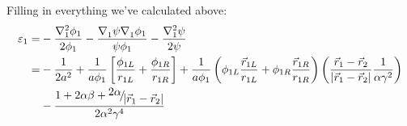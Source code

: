 Filling in everything we've calculated above:
\begin{align}
{\varepsilon _1} =&  - \frac{{\nabla _1^2{\phi _1}}}{{2{\phi _1}}} - \frac{{\nabla _1^{}\psi \nabla _1^{}{\phi _1}}}{{\psi {\phi _1}}} - \frac{{\nabla _1^2\psi }}{{2\psi }}\nonumber\\
 =&  - \frac{1}{{2{a^2}}} + \frac{1}{{a{\phi _1}}}\left[ {\frac{{{\phi _{1L}}}}{{{r_{1L}}}} + \frac{{{\phi _{1R}}}}{{{r_{1R}}}}} \right] + \frac{1}{{a{\phi _1}}}\left( {{\phi _{1L}}\frac{{{{\vec r}_{1L}}}}{{{r_{1L}}}} + {\phi _{1R}}\frac{{{{\vec r}_{1R}}}}{{{r_{1R}}}}} \right)\left( {\frac{{{{\vec r}_1} - {{\vec r}_2}}}{{\left| {{{\vec r}_1} - {{\vec r}_2}} \right|}}\frac{1}{{\alpha {\gamma ^2}}}} \right)\nonumber\\ &- \frac{{1 + 2\alpha \beta  + {\raise0.7ex\hbox{${2\alpha }$} \!\mathord{\left/
 {\vphantom {{2\alpha } {\left| {{{\vec r}_1} - {{\vec r}_2}} \right|}}}\right.\kern-\nulldelimiterspace}
\!\lower0.7ex\hbox{${\left| {{{\vec r}_1} - {{\vec r}_2}} \right|}$}}}}{{2{\alpha ^2}{\gamma ^4}}}
\end{align}\\

